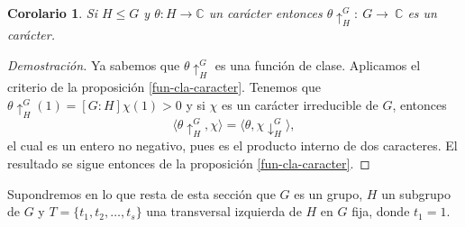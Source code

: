 \documentclass[12pt]{book}
\newtheorem{corollary}[theorem]{Corolario}
\theoremstyle{definition}
\newcounter{in}
\begin{document}
\begin{corollary}
  \label{car-inducido}
  Si $H\leq G$ y $\theta:H\rightarrow \mathbb{C}$ un carácter
  entonces $\theta\uparrow^{G}_{H}:~G\rightarrow~\mathbb{C}$ es un carácter.
\end{corollary}
\begin{proof}[Demostración]
  Ya sabemos que $\theta\uparrow^{G}_{H}$ es una función de
  clase. Aplicamos el criterio de la proposición
  \ref{fun-cla-caracter}. Tenemos que
  $\theta\uparrow^{G}_{H}(1)=[G:H]\chi(1)>0$ y si $\chi$ es un
  carácter irreducible de $G$, entonces
  \begin{equation*}
    \langle\theta\uparrow^{G}_{H},\chi\rangle=\langle\theta,\chi\downarrow^{G}_{H}\rangle,
  \end{equation*}
  el cual es un entero no negativo, pues es el producto interno de dos
  caracteres. %
  El resultado se sigue entonces de la proposición
  \ref{fun-cla-caracter}.
\end{proof}
Supondremos en lo que resta de esta sección que $G$ es un grupo, $H$ un subgrupo de
$G$  y $T=\{t_{1},t_{2},\ldots,t_{s}\}$ una transversal izquierda de
$H$ en $G$ fija, donde $t_{1}=1$.
\end{document}
